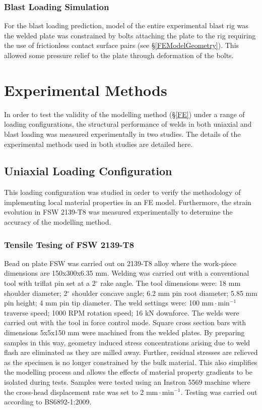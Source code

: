 \subsubsection{Blast Loading Simulation}
For the blast loading prediction, model of the entire experimental blast rig was  the welded plate was constrained by bolts attaching the plate to the rig requiring the use of frictionless contact surface pairs (see \S\ref{FEModelGeometry}). This allowed some pressure relief to the plate through deformation of the bolts.

\section{Experimental Methods}
\label{EM}
In order to test the validity of the modelling method (\S\ref{FE}) under a range of loading configurations, the structural performance of welds in both uniaxial and blast loading was measured experimentally in two studies. The details of the experimental methods used in both studies are detailed here.

\subsection{Uniaxial Loading Configuration}
\label{EMUniaxialLoading}
This loading configuration was studied in order to verify the methodology of implementing local material properties in an FE model. Furthermore, the strain evolution in FSW 2139-T8 was measured experimentally to determine the accuracy of the modelling method. 
\subsubsection{Tensile Tesing of FSW 2139-T8}
\label{EMTensileTesting}
Bead on plate FSW was carried out on 2139-T8 alloy where the work-piece dimensions are 150x300x6.35 mm. Welding was carried out with a conventional tool with triflat pin set at a 2$^\circ$ rake angle. The tool dimensions were: 18 mm shoulder diameter; 2$^\circ$ shoulder concave angle; 6.2 mm pin root diameter; 5.85 mm pin height; 4 mm pin tip diameter. The weld settings were: 100 $\text{mm}\!\cdot\!\text{min}^{-1}$ traverse speed; 1000 RPM rotation speed; 16 kN downforce. The welds were carried out with the tool in force control mode. 
Square cross section bars with dimensions 5x5x150 mm were machined from the welded plates. By preparing samples in this way, geometry induced stress concentrations arising due to weld flash are eliminated as they are milled away. Further, residual stresses are relieved as the specimen is no longer constrained by the bulk material. This also simplifies the modelling process and allows the effects of material property gradients to be isolated during tests. Samples were tested using an Instron 5569 machine where the cross-head displacement rate was set to 2 $\text{mm}\!\cdot\!\text{min}^{-1}$. Testing was carried out according to BS6892-1:2009.
